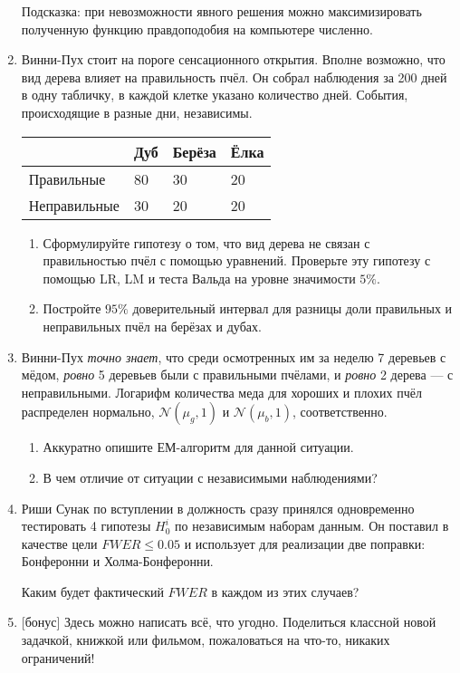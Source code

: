 \documentclass[12pt]{article}
\newcommand \cN{\mathcal{N}}
\begin{document}
\begin{enumerate}
Подсказка: при невозможности явного решения можно максимизировать полученную функцию правдоподобия на компьютере численно. 



\newpage


\item Винни-Пух стоит на пороге сенсационного открытия. Вполне возможно, что вид дерева влияет на правильность пчёл. 
Он собрал наблюдения за 200 дней в одну табличку, в каждой клетке указано количество дней. 
События, происходящие в разные дни, независимы. 


    \begin{tabular}{@{}llll@{}}
    \toprule
    & Дуб & Берёза & Ёлка \\ \midrule
    Правильные & 80 &  30  & 20\\
    Неправильные & 30  & 20 & 20 \\ \bottomrule
    \end{tabular}


\begin{enumerate}
    \item Сформулируйте гипотезу о том, что вид дерева не связан с правильностью пчёл с помощью уравнений. 
    Проверьте эту гипотезу с помощью LR, LM и теста Вальда на уровне значимости $5\%$.
    \item Постройте $95\%$ доверительный интервал для разницы доли правильных и неправильных пчёл на берёзах и дубах. 
\end{enumerate}


\item Винни-Пух \textit{точно знает}, что среди осмотренных им за неделю 7 деревьев с мёдом, \textit{ровно} 5 деревьев были с правильными 
пчёлами, и \textit{ровно} 2 дерева — с неправильными. 
Логарифм количества меда для хороших и плохих пчёл распределен нормально, $\cN(\mu_g, 1)$ и $\cN(\mu_b, 1)$, соответственно. 

\begin{enumerate}
    \item Аккуратно опишите ЕМ-алгоритм для данной ситуации.
    \item В чем отличие от ситуации с независимыми наблюдениями?
\end{enumerate}



\item Риши Сунак по вступлении в должность сразу принялся одновременно тестировать 4 гипотезы $H_0^i$ по независимым наборам данным.
Он поставил в качестве цели $FWER \leq 0.05$ и использует для реализации две поправки: Бонферонни и Холма-Бонферонни. 

Каким будет фактический $FWER$ в каждом из этих случаев?

\item {[бонус]} Здесь можно написать всё, что угодно. 
Поделиться классной новой задачкой, книжкой или фильмом, пожаловаться на что-то, никаких ограничений!

\end{enumerate}
\end{document}
